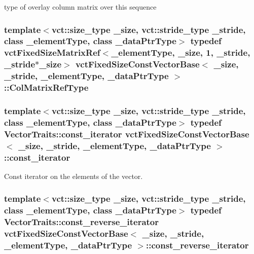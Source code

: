 type of overlay column matrix over this sequence \hypertarget{classvct_fixed_size_const_vector_base_ac2454662f16abd75fdef4ce8d2a00a48}{
\subsubsection[{Col\-Matrix\-Ref\-Type}]{\setlength{\rightskip}{0pt plus 5cm}template$<$vct\-::size\-\_\-type \-\_\-size, vct\-::stride\-\_\-type \-\_\-stride, class \-\_\-element\-Type, class \-\_\-data\-Ptr\-Type$>$ typedef {\bf vct\-Fixed\-Size\-Matrix\-Ref}$<$\-\_\-element\-Type, \-\_\-size, 1, \-\_\-stride, \-\_\-stride$\ast$\-\_\-size$>$ {\bf vct\-Fixed\-Size\-Const\-Vector\-Base}$<$ \-\_\-size, \-\_\-stride, \-\_\-element\-Type, \-\_\-data\-Ptr\-Type $>$\-::{\bf Col\-Matrix\-Ref\-Type}}}\label{classvct_fixed_size_const_vector_base_ac2454662f16abd75fdef4ce8d2a00a48}
\hypertarget{classvct_fixed_size_const_vector_base_abc547e0542bb6f7d92876a56c7ea5cdc}{
\subsubsection[{const\-\_\-iterator}]{\setlength{\rightskip}{0pt plus 5cm}template$<$vct\-::size\-\_\-type \-\_\-size, vct\-::stride\-\_\-type \-\_\-stride, class \-\_\-element\-Type, class \-\_\-data\-Ptr\-Type$>$ typedef {\bf Vector\-Traits\-::const\-\_\-iterator} {\bf vct\-Fixed\-Size\-Const\-Vector\-Base}$<$ \-\_\-size, \-\_\-stride, \-\_\-element\-Type, \-\_\-data\-Ptr\-Type $>$\-::{\bf const\-\_\-iterator}}}\label{classvct_fixed_size_const_vector_base_abc547e0542bb6f7d92876a56c7ea5cdc}
Const iterator on the elements of the vector. \hypertarget{classvct_fixed_size_const_vector_base_acd0a5fe64ff3551c45cebfb2ba81cf10}{
\subsubsection[{const\-\_\-reverse\-\_\-iterator}]{\setlength{\rightskip}{0pt plus 5cm}template$<$vct\-::size\-\_\-type \-\_\-size, vct\-::stride\-\_\-type \-\_\-stride, class \-\_\-element\-Type, class \-\_\-data\-Ptr\-Type$>$ typedef {\bf Vector\-Traits\-::const\-\_\-reverse\-\_\-iterator} {\bf vct\-Fixed\-Size\-Const\-Vector\-Base}$<$ \-\_\-size, \-\_\-stride, \-\_\-element\-Type, \-\_\-data\-Ptr\-Type $>$\-::{\bf const\-\_\-reverse\-\_\-iterator}}}\label{classvct_fixed_size_const_vector_base_acd0a5fe64ff3551c45cebfb2ba81cf10}
